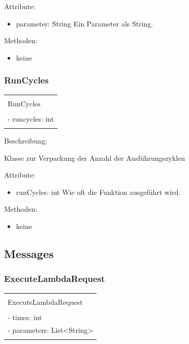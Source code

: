 \documentclass[a4paper,20pt,oneside]{book}
\begin{document}
	\vspace{0.5cm}
	Attribute:
	\begin{itemize}
	\item parameter: String \linebreak
	Ein Parameter als String.
	\end{itemize}
	
	Methoden:
	\begin{itemize}
	\item keine
	\end{itemize}
	
	\subsubsection{RunCycles}
		\centering
	\begin{tabular}{|l|}
	\hline \\
	RunCycles\\
	\hline \\
	- runcycles: int\\
   
    \hline \\
	\hline 
	\end{tabular}
	
	\raggedright
	\vspace{0.5cm}
	Beschreibung:
	
	Klasse zur Verpackung der Anzahl der Ausführungszyklen
	
	\vspace{0.5cm}
	Attribute:
	\begin{itemize}
	\item runCycles: int \linebreak
	Wie oft die Funktion ausgeführt wird.
	\end{itemize}
	
	Methoden:
	\begin{itemize}
	\item keine
	\end{itemize}
	
	\subsection{Messages}
	\subsubsection{ExecuteLambdaRequest}
		\centering
	\begin{tabular}{|l|}
	\hline \\
	ExecuteLambdaRequest\\
	\hline \\
	- times: int\\
    - parameters: List<String>\\
   
    \hline \\
	\hline 
	\end{tabular}
	
\end{document}
